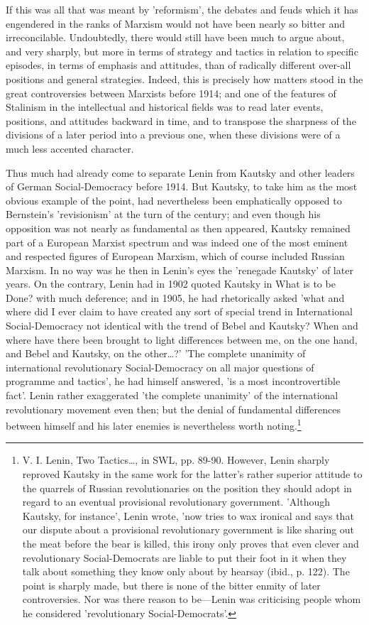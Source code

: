 If this was all that was meant by 'reformism', the debates and feuds which it has engendered in the ranks of Marxism would not have been nearly so bitter and irreconcilable. Undoubtedly, there would still have been much to argue about, and very sharply, but more in terms of strategy and tactics in relation to specific episodes, in terms of emphasis and attitudes, than of radically different over-all positions and general strategies. Indeed, this is precisely how matters stood in the great controversies between Marxists before 1914; and one of the features of Stalinism in the intellectual and historical fields was to read later events, positions, and attitudes backward in time, and to transpose the sharpness of the divisions of a later period into a previous one, when these divisions were of a much less accented character.

Thus much had already come to separate Lenin from Kautsky and other leaders of German Social-Democracy before 1914. But Kautsky, to take him as the most obvious example of the point, had nevertheless been emphatically opposed to Bernstein's 'revisionism' at the turn of the century; and even though his opposition was not nearly as fundamental as then appeared, Kautsky remained part of a European Marxist spectrum and was indeed one of the most eminent and respected figures of European Marxism, which of course included Russian Marxism. In  no way was he then in Lenin's eyes the 'renegade Kautsky' of later years. On the contrary, Lenin had in 1902 quoted Kautsky in What is to be Done? with much deference; and in 1905, he had rhetorically asked 'what and where did I ever claim to have created any sort of special trend in International Social\hyp{}Democracy not identical with the trend of Bebel and Kautsky? When and where have there been brought to light differences between me, on the one hand, and Bebel and Kautsky, on the other\dots{}?' 'The complete unanimity of international revolutionary Social-Democracy on all major questions of programme and tactics', he had himself answered, 'is a most incontrovertible fact'. Lenin rather exaggerated 'the complete unanimity' of the international revolutionary movement even then; but the denial of fundamental differences between himself and his later enemies is nevertheless worth noting.\footnote{V. I. Lenin, Two Tactics\dots{}, in SWL, pp. 89-90. However, Lenin sharply reproved Kautsky in the same work for the latter's rather superior attitude to the quarrels of Russian revolutionaries on the position they should adopt in regard to an eventual provisional revolutionary government. 'Although Kautsky, for instance', Lenin wrote, 'now tries to wax ironical and says that our dispute about a provisional revolutionary government is like sharing out the meat before the bear is killed, this irony only proves that even clever and revolutionary Social-Democrats are liable to put their foot in it when they talk about something they know only about by hearsay (ibid., p. 122). The point is sharply made, but there is none of the bitter enmity of later controversies. Nor was there reason to be—Lenin was criticising people whom he considered 'revolutionary Social-Democrats'.}

